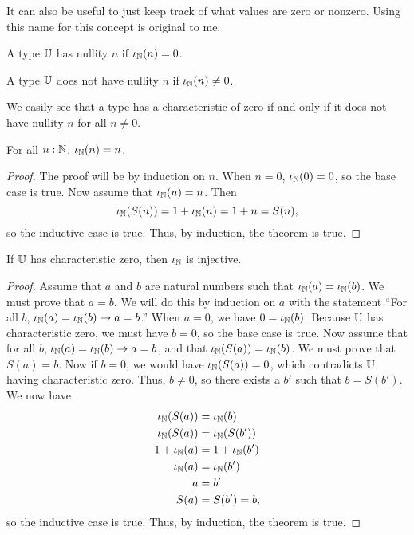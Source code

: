 \documentclass[../../math.tex]{subfiles}
\begin{document}
It can also be useful to just keep track of what values are zero or nonzero.
Using this name for this concept is original to me.

\begin{class}
    A type $\mathbb{U}$ has nullity $n$ if $\iota_{\mathbb{N}}(n) = 0$.
\end{class}
\begin{class}
    A type $\mathbb{U}$ does not have nullity $n$ if $\iota_{\mathbb{N}}(n) \neq 0$.
\end{class}

We easily see that a type has a characteristic of zero if and only if it does
not have nullity $n$ for all $n \neq 0$.

\begin{theorem}
    For all $n : \mathbb{N}$, $\iota_{\mathbb{N}}(n) = n$.
\end{theorem}
\begin{proof}
    The proof will be by induction on $n$.  When $n = 0$, $\iota_{\mathbb{N}}(0) = 0$, so
    the base case is true.  Now assume that $\iota_{\mathbb{N}}(n) = n$.  Then
    \[
        \iota_{\mathbb{N}}(S(n)) = 1 + \iota_{\mathbb{N}}(n) = 1 + n = S(n),
    \]
    so the inductive case is true.  Thus, by induction, the theorem is true.
\end{proof}

\begin{instance}
    If $\mathbb{U}$ has characteristic zero, then $\iota_{\mathbb{N}}$ is injective.
\end{instance}
\begin{proof}
    Assume that $a$ and $b$ are natural numbers such that $\iota_{\mathbb{N}}(a) =
    \iota_{\mathbb{N}}(b)$.  We must prove that $a = b$.  We will do this by induction on
    $a$ with the statement ``For all $b$, $\iota_{\mathbb{N}}(a) = \iota_{\mathbb{N}}(b) \rightarrow
    a = b$.''  When $a = 0$, we have $0 = \iota_{\mathbb{N}}(b)$.  Because $\mathbb{U}$ has
    characteristic zero, we must have $b = 0$, so the base case is true.  Now
    assume that for all $b$, $\iota_{\mathbb{N}}(a) = \iota_{\mathbb{N}}(b) \rightarrow a = b$, and
    that $\iota_{\mathbb{N}}(S(a)) = \iota_{\mathbb{N}}(b)$.  We must prove that $S(a) = b$.  Now if
    $b = 0$, we would have $\iota_{\mathbb{N}}(S(a)) = 0$, which contradicts $\mathbb{U}$ having
    characteristic zero.  Thus, $b \neq 0$, so there exists a $b'$ such that $b
    = S(b')$.  We now have
    \begin{align*}
        \iota_{\mathbb{N}}(S(a)) &= \iota_{\mathbb{N}}(b) \\
        \iota_{\mathbb{N}}(S(a)) &= \iota_{\mathbb{N}}(S(b')) \\
        1 + \iota_{\mathbb{N}}(a) &= 1 + \iota_{\mathbb{N}}(b') \\
        \iota_{\mathbb{N}}(a) &= \iota_{\mathbb{N}}(b') \\
        a &= b' \\
        S(a) &= S(b') = b,
    \end{align*}
    so the inductive case is true.  Thus, by induction, the theorem is true.
\end{proof}
\end{document}
